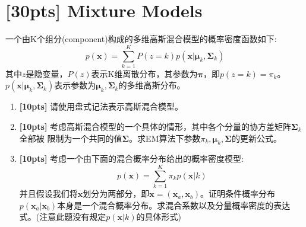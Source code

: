 \documentclass[a4paper,UTF8]{article}
\numberwithin{equation}{section}
\begin{document}
\section{\textbf{[30pts]} Mixture Models}
一个由K个组分(component)构成的多维高斯混合模型的概率密度函数如下:
\begin{equation}
    p\left(\boldsymbol{x}\right) = \sum_{k=1}^{K} P\left(z=k\right) p\left(\boldsymbol{x}|\boldsymbol{\mu}_k,\boldsymbol{\Sigma}_k\right)
\end{equation}
其中$z$是隐变量，$P(z)$表示K维离散分布，其参数为$\boldsymbol{\pi}$，即$p\left(z=k\right) = \pi_k$。$p\left(\boldsymbol{x}|\boldsymbol{\mu}_k,\boldsymbol{\Sigma}_k\right)$表示参数为$\boldsymbol{\mu}_k,\boldsymbol{\Sigma}_k$的多维高斯分布。
\begin{enumerate}
    \item  \textbf{[10pts]} 请使用盘式记法表示高斯混合模型。
    \item \textbf{[10pts]} 考虑高斯混合模型的一个具体的情形，其中各个分量的协方差矩阵$\boldsymbol{\Sigma}_k$全部被
限制为一个共同的值$\boldsymbol{\Sigma}$。求EM算法下参数$\pi_k,\boldsymbol{\mu}_k,\boldsymbol{\Sigma}$的更新公式。
\item \textbf{[10pts]} 考虑一个由下面的混合概率分布给出的概率密度模型:
\begin{equation}
    p\left(\boldsymbol{x}\right) = \sum_{k=1}^{K} \pi_k p\left(\boldsymbol{x}| k\right)
\end{equation}
并且假设我们将$\boldsymbol{x}$划分为两部分，即$\boldsymbol{x} = \left(\boldsymbol{x}_a,\boldsymbol{x}_b\right)$。证明条件概率分布$p\left(\boldsymbol{x}_a|\boldsymbol{x}_b\right)$本身是一个混合概率分布。求混合系数以及分量概率密度的表达式。(注意此题没有规定$p\left(\boldsymbol{x}|k\right)$的具体形式)
\end{enumerate}
\end{document}

